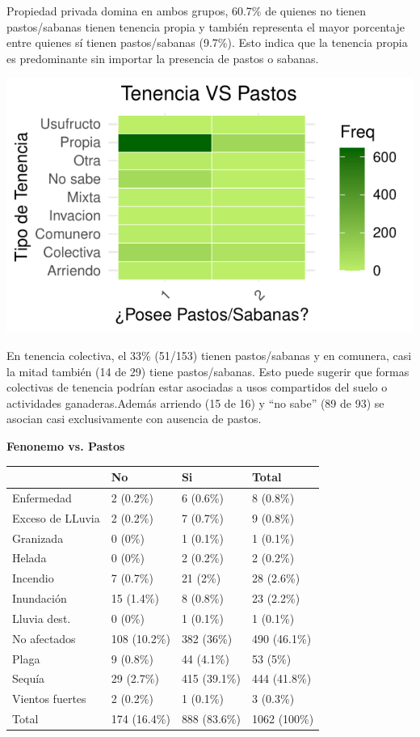\documentclass[]{tufte-handout}
\begin{document}
Propiedad privada domina en ambos grupos, 60.7\% de quienes no tienen
pastos/sabanas tienen tenencia propia y también representa el mayor
porcentaje entre quienes sí tienen pastos/sabanas (9.7\%). Esto indica
que la tenencia propia es predominante sin importar la presencia de
pastos o sabanas.

\begin{marginfigure}
\includegraphics[width=1.3\linewidth]{Informe_files/figure-latex/heat5-1} \end{marginfigure}

En tenencia colectiva, el 33\% (51/153) tienen pastos/sabanas y en
comunera, casi la mitad también (14 de 29) tiene pastos/sabanas. Esto
puede sugerir que formas colectivas de tenencia podrían estar asociadas
a usos compartidos del suelo o actividades ganaderas.Además arriendo (15
de 16) y ``no sabe'' (89 de 93) se asocian casi exclusivamente con
ausencia de pastos.

\begin{center}
\textbf{Fenonemo vs. Pastos}
\end{center}

\begin{tabular}{llll}
\toprule
  & No & Si & Total\\
\midrule
Enfermedad & 2 (0.2\%) & 6 (0.6\%) & 8 (0.8\%)\\
Exceso de LLuvia & 2 (0.2\%) & 7 (0.7\%) & 9 (0.8\%)\\
Granizada & 0 (0\%) & 1 (0.1\%) & 1 (0.1\%)\\
Helada & 0 (0\%) & 2 (0.2\%) & 2 (0.2\%)\\
Incendio & 7 (0.7\%) & 21 (2\%) & 28 (2.6\%)\\
\addlinespace
Inundación & 15 (1.4\%) & 8 (0.8\%) & 23 (2.2\%)\\
Lluvia dest. & 0 (0\%) & 1 (0.1\%) & 1 (0.1\%)\\
No afectados & 108 (10.2\%) & 382 (36\%) & 490 (46.1\%)\\
Plaga & 9 (0.8\%) & 44 (4.1\%) & 53 (5\%)\\
Sequía & 29 (2.7\%) & 415 (39.1\%) & 444 (41.8\%)\\
\addlinespace
Vientos fuertes & 2 (0.2\%) & 1 (0.1\%) & 3 (0.3\%)\\
Total & 174 (16.4\%) & 888 (83.6\%) & 1062 (100\%)\\
\bottomrule
\end{tabular}
\vspace{0.7 cm}
\end{document}
